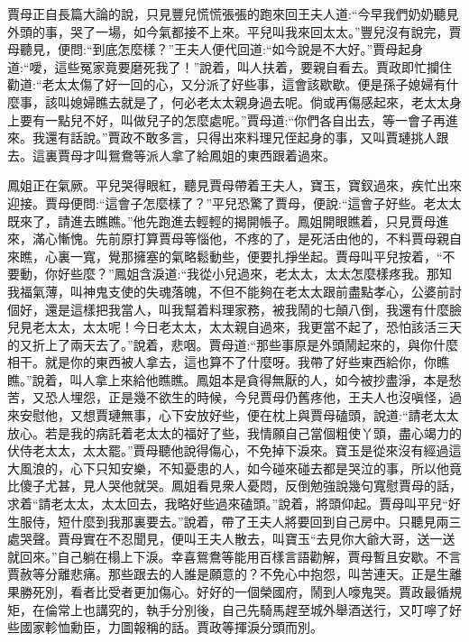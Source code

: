 \begin{parag}
    賈母正自長篇大論的說，只見豐兒慌慌張張的跑來回王夫人道:“今早我們奶奶聽見外頭的事，哭了一場，如今氣都接不上來。平兒叫我來回太太。”豐兒沒有說完，賈母聽見，便問:“到底怎麼樣？”王夫人便代回道:“如今說是不大好。”賈母起身道:“噯，這些冤家竟要磨死我了！”說着，叫人扶着，要親自看去。賈政即忙攔住勸道:“老太太傷了好一回的心，又分派了好些事，這會該歇歇。便是孫子媳婦有什麼事，該叫媳婦瞧去就是了，何必老太太親身過去呢。倘或再傷感起來，老太太身上要有一點兒不好，叫做兒子的怎麼處呢。”賈母道:“你們各自出去，等一會子再進來。我還有話說。”賈政不敢多言，只得出來料理兄侄起身的事，又叫賈璉挑人跟去。這裏賈母才叫鴛鴦等派人拿了給鳳姐的東西跟着過來。
\end{parag}


\begin{parag}
    鳳姐正在氣厥。平兒哭得眼紅，聽見賈母帶着王夫人，寶玉，寶釵過來，疾忙出來迎接。賈母便問:“這會子怎麼樣了？”平兒恐驚了賈母，便說:“這會子好些。老太太既來了，請進去瞧瞧。”他先跑進去輕輕的揭開帳子。鳳姐開眼瞧着，只見賈母進來，滿心慚愧。先前原打算賈母等惱他，不疼的了，是死活由他的，不料賈母親自來瞧，心裏一寬，覺那擁塞的氣略鬆動些，便要扎掙坐起。賈母叫平兒按着，“不要動，你好些麼？”鳳姐含淚道:“我從小兒過來，老太太，太太怎麼樣疼我。那知我福氣薄，叫神鬼支使的失魂落魄，不但不能夠在老太太跟前盡點孝心，公婆前討個好，還是這樣把我當人，叫我幫着料理家務，被我鬧的七顛八倒，我還有什麼臉兒見老太太，太太呢！今日老太太，太太親自過來，我更當不起了，恐怕該活三天的又折上了兩天去了。”說着，悲咽。賈母道:“那些事原是外頭鬧起來的，與你什麼相干。就是你的東西被人拿去，這也算不了什麼呀。我帶了好些東西給你，你瞧瞧。”說着，叫人拿上來給他瞧瞧。鳳姐本是貪得無厭的人，如今被抄盡淨，本是愁苦，又恐人埋怨，正是幾不欲生的時候，今兒賈母仍舊疼他，王夫人也沒嗔怪，過來安慰他，又想賈璉無事，心下安放好些，便在枕上與賈母磕頭，說道:“請老太太放心。若是我的病託着老太太的福好了些，我情願自己當個粗使丫頭，盡心竭力的伏侍老太太，太太罷。”賈母聽他說得傷心，不免掉下淚來。寶玉是從來沒有經過這大風浪的，心下只知安樂，不知憂患的人，如今碰來碰去都是哭泣的事，所以他竟比傻子尤甚，見人哭他就哭。鳳姐看見衆人憂悶，反倒勉強說幾句寬慰賈母的話，求着“請老太太，太太回去，我略好些過來磕頭。”說着，將頭仰起。賈母叫平兒“好生服侍，短什麼到我那裏要去。”說着，帶了王夫人將要回到自己房中。只聽見兩三處哭聲。賈母實在不忍聞見，便叫王夫人散去，叫寶玉“去見你大爺大哥，送一送就回來。”自己躺在榻上下淚。幸喜鴛鴦等能用百樣言語勸解，賈母暫且安歇。不言賈赦等分離悲痛。那些跟去的人誰是願意的？不免心中抱怨，叫苦連天。正是生離果勝死別，看者比受者更加傷心。好好的一個榮國府，鬧到人嚎鬼哭。賈政最循規矩，在倫常上也講究的，執手分別後，自己先騎馬趕至城外舉酒送行，又叮嚀了好些國家軫恤勳臣，力圖報稱的話。賈政等揮淚分頭而別。
\end{parag}


